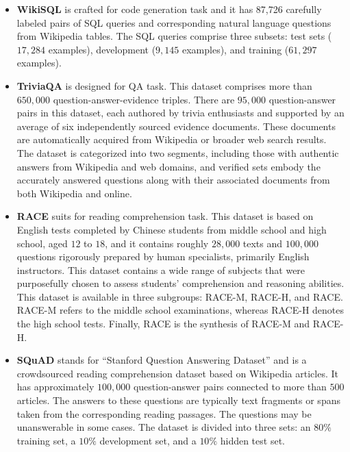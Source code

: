 \documentclass[conference]{IEEEtran}
\begin{document}
\begin{itemize}
     \item \textbf{WikiSQL} \cite{zhong2017seq2sql} is crafted for code generation task and it has 87,726 carefully labeled pairs of SQL queries and corresponding natural language questions from Wikipedia tables. The SQL queries comprise three subsets: test sets ($17,284$ examples), development ($9,145$ examples), and training ($61,297$ examples).

    \item \textbf{TriviaQA} \cite{joshi-etal-2017-triviaqa} is designed for QA task. This dataset comprises more than $650,000$ question-answer-evidence triples. There are $95,000$ question-answer pairs in this dataset, each authored by trivia enthusiasts and supported by an average of six independently sourced evidence documents. These documents are automatically acquired from Wikipedia or broader web search results. The dataset is categorized into two segments, including those with authentic answers from Wikipedia and web domains, and verified sets embody the accurately answered questions along with their associated documents from both Wikipedia and online.

    \item \textbf{RACE} \cite{lai-etal-2017-race} suits for reading comprehension task. This dataset is based on English tests completed by Chinese students from middle school and high school, aged $12$ to $18$, and it contains roughly $28,000$ texts and $100,000$ questions rigorously prepared by human specialists, primarily English instructors. This dataset contains a wide range of subjects that were purposefully chosen to assess students' comprehension and reasoning abilities.  This dataset is available in three subgroups: RACE-M, RACE-H, and RACE. RACE-M refers to the middle school examinations, whereas RACE-H denotes the high school tests. Finally, RACE is the synthesis of RACE-M and RACE-H.
    
    \item \textbf{SQuAD} \cite{rajpurkar-etal-2016-squad} stands for ``Stanford Question Answering Dataset'' and is a crowdsourced reading comprehension dataset based on Wikipedia articles. It has approximately $100,000$ question-answer pairs connected to more than $500$ articles. The answers to these questions are typically text fragments or spans taken from the corresponding reading passages. The questions may be unanswerable in some cases. The dataset is divided into three sets: an $80\%$ training set, a $10\%$ development set, and a $10\%$ hidden test set. 


\end{itemize}
\end{document}
